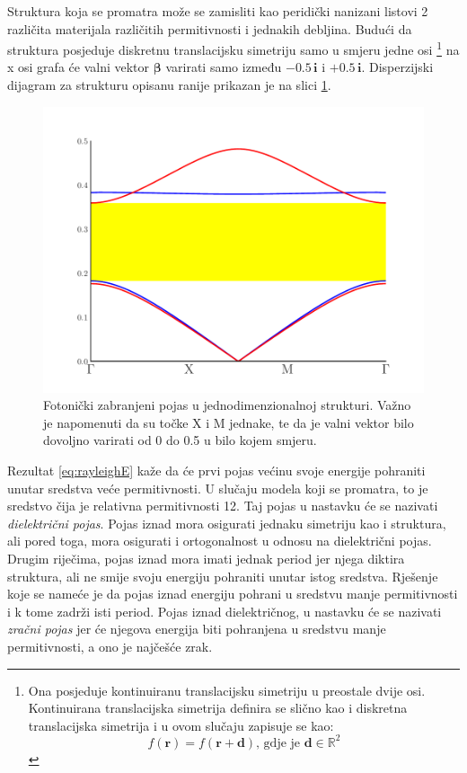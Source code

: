 \documentclass[utf8, seminar, numeric]{fer}
\begin{document}
Struktura koja se promatra može se zamisliti kao peridički nanizani listovi 2
različita materijala različitih permitivnosti i jednakih debljina. Budući da
struktura posjeduje diskretnu translacijsku simetriju samo u smjeru jedne osi
\footnote{
	Ona posjeduje kontinuiranu translacijsku simetriju u preostale dvije osi.
	Kontinuirana translacijska simetrija definira se slično kao i diskretna
	translacijska simetrija i u ovom slučaju zapisuje se kao:
	$$f(\mathbf{r}) = f(\mathbf{r} + \mathbf{d})
	\text{, gdje je }{\mathbf{d} \in \mathbb{R}^2}$$
}
na x osi grafa će valni vektor ${\bm{\beta}}$ varirati samo između
$-0.5 \, \mathbf{i}$ i $+0.5 \, \mathbf{i}$. Disperzijski dijagram za strukturu
opisanu ranije prikazan je na slici \ref{fig:1d_band_diagram}.
\begin{figure}[ht]
	\centering
	\includegraphics[width = 0.9\linewidth]{./images/pdf/1d_crystal_band_gap.pdf}
	\caption{Fotonički zabranjeni pojas u jednodimenzionalnoj strukturi.
	Važno je napomenuti da su točke X i M jednake, te da je valni vektor bilo
	dovoljno varirati od 0 do 0.5 u bilo kojem smjeru.}
	\label{fig:1d_band_diagram}
\end{figure}

Rezultat \ref{eq:rayleighE} kaže da će prvi pojas većinu svoje energije
pohraniti unutar sredstva veće permitivnosti. U slučaju modela koji se
promatra, to je sredstvo čija je relativna permitivnosti 12. Taj pojas
u nastavku će se nazivati \emph{dielektrični pojas}. Pojas iznad mora
osigurati jednaku simetriju kao i struktura, ali pored toga, mora osigurati i
ortogonalnost u odnosu na dielektrični pojas. Drugim riječima, pojas iznad
mora imati jednak period jer njega diktira struktura, ali ne smije svoju
energiju pohraniti unutar istog sredstva. Rješenje koje se nameće je da pojas
iznad energiju pohrani u sredstvu manje permitivnosti i k tome zadrži
isti period. Pojas iznad dielektričnog, u nastavku će se nazivati \emph{zračni
pojas} jer će njegova energija biti pohranjena u sredstvu manje permitivnosti,
a ono je najčešće zrak.
\end{document}

